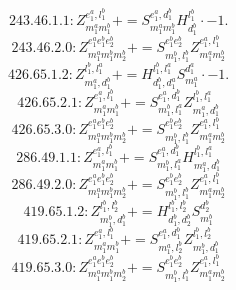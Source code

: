 \documentclass[letterpaper,10pt,fleqn,leqno,onecolumn]{article}
\begin{document}
\begin{equation} \;\;\;\;\;\;  243.46.1.1: Z^{e_{1}^{a},l_{1}^{b}}_{m_{1}^{a}m_{1}^{b}}+=S^{e_{1}^{a},d_{1}^{b}}_{m_{1}^{a}m_{1}^{b}}H^{l_{1}^{b}}_{d_{1}^{b}}\cdot -1. \end{equation}
\begin{equation} \;\;\;\;\;\;  243.46.2.0: Z^{e_{1}^{a}e_{1}^{b}e_{2}^{b}}_{m_{1}^{a}m_{1}^{b}m_{2}^{b}}+=S^{e_{1}^{b}e_{2}^{b}}_{m_{1}^{b},l_{1}^{b}}Z^{e_{1}^{a},l_{1}^{b}}_{m_{1}^{a}m_{2}^{b}} \end{equation}
\begin{equation} \;\;\;\;\;\;  426.65.1.2: Z^{l_{1}^{b},l_{1}^{a}}_{m_{1}^{a},d_{1}^{b}}+=H^{l_{1}^{b},l_{1}^{a}}_{d_{1}^{b},d_{1}^{a}}S^{d_{1}^{a}}_{m_{1}^{a}}\cdot -1. \end{equation}
\begin{equation} \;\;\;\;\;\;  426.65.2.1: Z^{e_{1}^{a},l_{1}^{b}}_{m_{1}^{a}m_{1}^{b}}+=S^{e_{1}^{a},d_{1}^{b}}_{m_{1}^{b},l_{1}^{a}}Z^{l_{1}^{b},l_{1}^{a}}_{m_{1}^{a},d_{1}^{b}} \end{equation}
\begin{equation} \;\;\;\;\;\;  426.65.3.0: Z^{e_{1}^{a}e_{1}^{b}e_{2}^{b}}_{m_{1}^{a}m_{1}^{b}m_{2}^{b}}+=S^{e_{1}^{b}e_{2}^{b}}_{m_{1}^{b},l_{1}^{b}}Z^{e_{1}^{a},l_{1}^{b}}_{m_{1}^{a}m_{2}^{b}} \end{equation}
\begin{equation} \;\;\;\;\;\;  286.49.1.1: Z^{e_{1}^{a},l_{1}^{b}}_{m_{1}^{a}m_{1}^{b}}+=S^{e_{1}^{a},d_{1}^{b}}_{m_{1}^{b},l_{1}^{a}}H^{l_{1}^{b},l_{1}^{a}}_{m_{1}^{a},d_{1}^{b}} \end{equation}
\begin{equation} \;\;\;\;\;\;  286.49.2.0: Z^{e_{1}^{a}e_{1}^{b}e_{2}^{b}}_{m_{1}^{a}m_{1}^{b}m_{2}^{b}}+=S^{e_{1}^{b}e_{2}^{b}}_{m_{1}^{b},l_{1}^{b}}Z^{e_{1}^{a},l_{1}^{b}}_{m_{1}^{a}m_{2}^{b}} \end{equation}
\begin{equation} \;\;\;\;\;\;  419.65.1.2: Z^{l_{1}^{b},l_{2}^{b}}_{m_{1}^{b},d_{1}^{b}}+=H^{l_{1}^{b},l_{2}^{b}}_{d_{1}^{b},d_{2}^{b}}S^{d_{2}^{b}}_{m_{1}^{b}} \end{equation}
\begin{equation} \;\;\;\;\;\;  419.65.2.1: Z^{e_{1}^{a},l_{1}^{b}}_{m_{1}^{a}m_{1}^{b}}+=S^{e_{1}^{a},d_{1}^{b}}_{m_{1}^{a},l_{2}^{b}}Z^{l_{1}^{b},l_{2}^{b}}_{m_{1}^{b},d_{1}^{b}} \end{equation}
\begin{equation} \;\;\;\;\;\;  419.65.3.0: Z^{e_{1}^{a}e_{1}^{b}e_{2}^{b}}_{m_{1}^{a}m_{1}^{b}m_{2}^{b}}+=S^{e_{1}^{b}e_{2}^{b}}_{m_{1}^{b},l_{1}^{b}}Z^{e_{1}^{a},l_{1}^{b}}_{m_{1}^{a}m_{2}^{b}} \end{equation}
\end{document}
